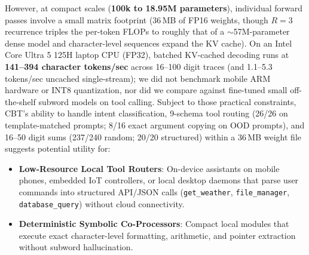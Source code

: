 \documentclass[10pt,twocolumn]{article}
\begin{document}
However, at compact scales (\textbf{100k to 18.95M parameters}), individual forward passes involve a small matrix footprint (36\,MB of FP16 weights, though $R=3$ recurrence triples the per-token FLOPs to roughly that of a $\sim$57M-parameter dense model and character-level sequences expand the KV cache). On an Intel Core Ultra 5 125H laptop CPU (FP32), batched KV-cached decoding runs at \textbf{141--394 character tokens/sec} across 16--100 digit traces (and 1.1--5.3 tokens/sec uncached single-stream); we did not benchmark mobile ARM hardware or INT8 quantization, nor did we compare against fine-tuned small off-the-shelf subword models on tool calling. Subject to those practical constraints, CBT's ability to handle intent classification, 9-schema tool routing (26/26 on template-matched prompts; 8/16 exact argument copying on OOD prompts), and 16--50 digit sums (237/240 random; 20/20 structured) within a 36\,MB weight file suggests potential utility for:
\begin{itemize}[leftmargin=*,nosep]
    \item \textbf{Low-Resource Local Tool Routers}: On-device assistants on mobile phones, embedded IoT controllers, or local desktop daemons that parse user commands into structured API/JSON calls (\texttt{get\_weather}, \texttt{file\_manager}, \texttt{database\_query}) without cloud connectivity.
    \item \textbf{Deterministic Symbolic Co-Processors}: Compact local modules that execute exact character-level formatting, arithmetic, and pointer extraction without subword hallucination.
\end{itemize}
\end{document}
